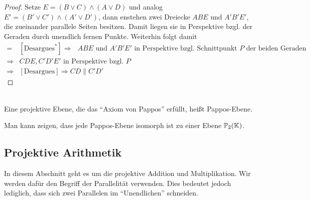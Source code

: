  \begin{proof}
    Setze $E=(B \vee C) \wedge (A \vee D)$ und analog $E' = (B' \vee C') \wedge (A' \vee D')$, dann enstehen zwei Dreiecke $ABE$ und 
    $A'B'E'$, die zueinander parallele Seiten besitzen. Damit liegen sie in Perspektive bzgl. der Geraden durch unendlich fernen 
    Punkte. Weiterhin folgt damit
    \begin{align*}
      = & [\mbox{Desargues}^*]\Rightarrow \mbox{ $ABE$ und $A'B'E'$ in Perspektive bzgl. 
        Schnittpunkt $P$ der beiden Geraden} \\
      \Rightarrow & CDE, C'D'E' \mbox{ in Perspektive bzgl. $P$} \\
      \Rightarrow & [\mbox{Desargues}] \Rightarrow CD \parallel C'D'
    \end{align*}
  \end{proof}

  \begin{defi} \ \\
    Eine projektive Ebene, die das "`Axiom von Pappos"' erfüllt, heißt Pappos-Ebene.
  \end{defi}

  \begin{bem}
    Man kann zeigen, dass jede Pappos-Ebene isomorph ist zu einer Ebene $\mathbb{P}_2(\mathbb K)$. 
  \end{bem}

\subsection*{Projektive Arithmetik}
    In diesem Abschnitt geht es um die projektive Addition und Multiplikation. Wir werden dafür den Begriff der Parallelität 
    verwenden. Dies bedeutet jedoch lediglich, dass sich zwei Parallelen im "`Unendlichen"' schneiden. 


